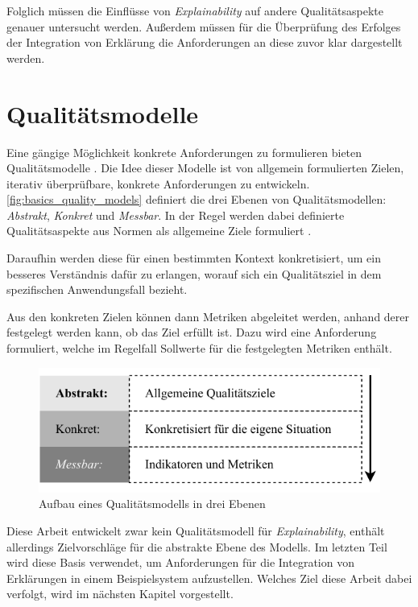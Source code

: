 Folglich müssen die Einflüsse von \textit{Explainability} auf andere Qualitätsaspekte genauer untersucht werden. Außerdem müssen für die Überprüfung des Erfolges der Integration von Erklärung die Anforderungen an diese zuvor klar dargestellt werden.

\section{Qualitätsmodelle}
\label{sec:basics_quality_models}

Eine gängige Möglichkeit konkrete Anforderungen zu formulieren bieten Qualitätsmodelle \cite{schneider2012abenteuer}. Die Idee dieser Modelle ist von allgemein formulierten Zielen, iterativ überprüfbare, konkrete Anforderungen zu entwickeln. \autoref{fig:basics_quality_models} definiert die drei Ebenen von Qualitätsmodellen: \textit{Abstrakt}, \textit{Konkret} und \textit{Messbar}. In der Regel werden dabei definierte Qualitätsaspekte aus Normen als allgemeine Ziele formuliert \cite[vgl.][]{schneider2012abenteuer}.

Daraufhin werden diese für einen bestimmten Kontext konkretisiert, um ein besseres Verständnis dafür zu erlangen, worauf sich ein Qualitätsziel in dem spezifischen Anwendungsfall bezieht.

Aus den konkreten Zielen können dann Metriken abgeleitet werden, anhand derer festgelegt werden kann, ob das Ziel erfüllt ist. Dazu wird eine Anforderung formuliert, welche im Regelfall Sollwerte für die festgelegten Metriken enthält.

\begin{figure}[htb!]
    \centering
    \includegraphics{contents/02_basics/res/quality_models.pdf}
    \caption{Aufbau eines Qualitätsmodells in drei Ebenen \cite[S. 34, ][]{schneider2012abenteuer}}
    \label{fig:basics_quality_models}
\end{figure}

Diese Arbeit entwickelt zwar kein Qualitätsmodell für \textit{Explainability}, enthält allerdings Zielvorschläge für die abstrakte Ebene des Modells. Im letzten Teil wird diese Basis verwendet, um Anforderungen für die Integration von Erklärungen in einem Beispielsystem aufzustellen. Welches Ziel diese Arbeit dabei verfolgt, wird im nächsten Kapitel vorgestellt.



